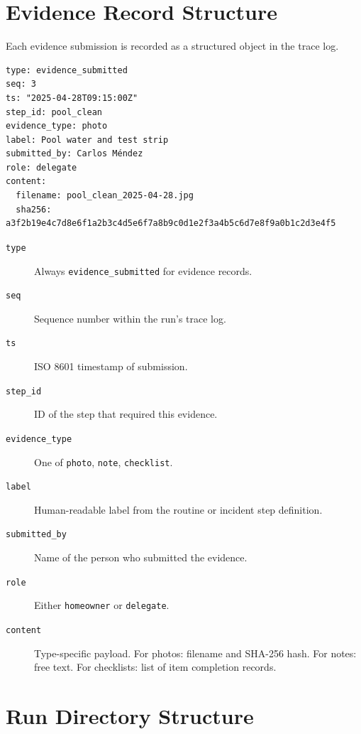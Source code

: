 \section{Evidence Record Structure}
\label{sec:evidence-record}

Each evidence submission is recorded as a structured object in the trace log.

\begin{verbatim}
type: evidence_submitted
seq: 3
ts: "2025-04-28T09:15:00Z"
step_id: pool_clean
evidence_type: photo
label: Pool water and test strip
submitted_by: Carlos Méndez
role: delegate
content:
  filename: pool_clean_2025-04-28.jpg
  sha256: a3f2b19e4c7d8e6f1a2b3c4d5e6f7a8b9c0d1e2f3a4b5c6d7e8f9a0b1c2d3e4f5
\end{verbatim}

\begin{description}
  \item[\texttt{type}] Always \texttt{evidence\_submitted} for evidence records.
  \item[\texttt{seq}] Sequence number within the run's trace log.
  \item[\texttt{ts}] ISO 8601 timestamp of submission.
  \item[\texttt{step\_id}] ID of the step that required this evidence.
  \item[\texttt{evidence\_type}] One of \texttt{photo}, \texttt{note}, \texttt{checklist}.
  \item[\texttt{label}] Human-readable label from the routine or incident step definition.
  \item[\texttt{submitted\_by}] Name of the person who submitted the evidence.
  \item[\texttt{role}] Either \texttt{homeowner} or \texttt{delegate}.
  \item[\texttt{content}] Type-specific payload. For photos: filename and SHA-256 hash.
        For notes: free text. For checklists: list of item completion records.
\end{description}

\section{Run Directory Structure}
\label{sec:evidence-run-dir}

